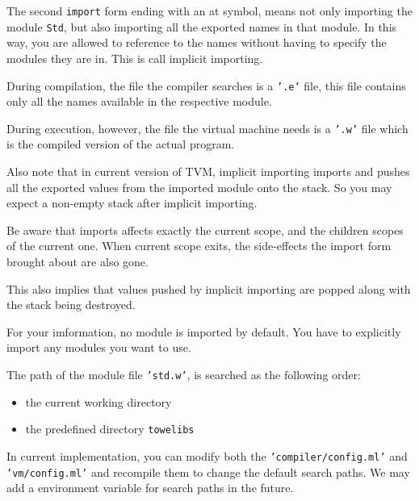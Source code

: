 \documentclass{report}
\begin{document}
The second \texttt{import} form ending with an at symbol, means not only importing the module \texttt{Std}, but also importing all the exported names in that module. In this way, you are allowed to reference to the names without having to specify the modules they are in. This is call implicit importing.

\begin{mdframed}[style=detail]
  During compilation, the file the compiler searches is a \texttt{'.e'} file, this file contains only all the names available in the respective module.

  During execution, however, the file the virtual machine needs is a \texttt{'.w'} file which is the compiled version of the actual program.

  Also note that in current version of TVM, implicit importing imports and pushes all the exported values from the imported module onto the stack. So you may expect a non-empty stack after implicit importing.
\end{mdframed}

\begin{mdframed}[style=detail]
  Be aware that imports affects exactly the current scope, and the children scopes of the current one. When current scope exits, the side-effects the import form brought about are also gone.

  This also implies that values pushed by implicit importing are popped along with the stack being destroyed.
\end{mdframed}

\begin{mdframed}[style=hint]
  For your imformation, no module is imported by default. You have to explicitly import any modules you want to use.
\end{mdframed}

The path of the module file \texttt{'std.w'}, is searched as the following order:
\begin{itemize}
\item the current working directory
\item the predefined directory \texttt{towelibs}
\end{itemize}

\begin{mdframed}[style=detail]
  In current implementation, you can modify both the \texttt{'compiler/config.ml'} and \texttt{'vm/config.ml'} and recompile them to change the default search paths. We may add a environment variable for search paths in the future.
\end{mdframed}
\end{document}
